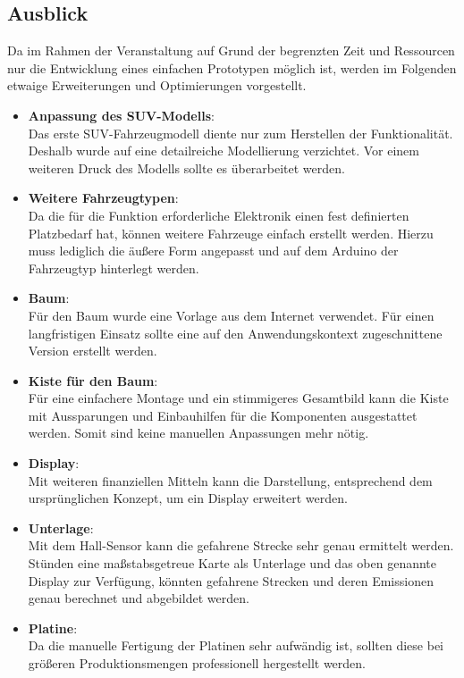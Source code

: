 \documentclass[.../Dokumentation.tex]{subfile}
\begin{document}
\subsection{Ausblick}\label{sec-outlook}
Da im Rahmen der Veranstaltung auf Grund der begrenzten Zeit und Ressourcen nur die Entwicklung eines einfachen Prototypen möglich ist, werden im Folgenden etwaige Erweiterungen und Optimierungen vorgestellt.
\begin{itemize}
	\item \textbf{Anpassung des SUV-Modells}:\\
	Das erste SUV-Fahrzeugmodell diente nur zum Herstellen der Funktionalität. 
	Deshalb wurde auf eine detailreiche Modellierung verzichtet. 
	Vor einem weiteren Druck des Modells sollte es überarbeitet werden.
	\item \textbf{Weitere Fahrzeugtypen}:\\
	Da die für die Funktion erforderliche Elektronik einen fest definierten 
	Platzbedarf hat, können weitere Fahrzeuge einfach erstellt werden. Hierzu 
	muss lediglich die äußere Form angepasst und auf dem Arduino der 
	Fahrzeugtyp hinterlegt werden. 
	\item \textbf{Baum}:\\
	Für den Baum wurde eine Vorlage aus dem Internet verwendet. Für einen 
	langfristigen Einsatz sollte eine auf den Anwendungskontext zugeschnittene 
	Version erstellt werden.
	\item \textbf{Kiste für den Baum}:\\
	Für eine einfachere Montage und ein stimmigeres Gesamtbild kann die Kiste 
	mit Aussparungen und Einbauhilfen für die Komponenten ausgestattet werden. 
	Somit sind keine manuellen Anpassungen mehr nötig.
	\item \textbf{Display}:\\
	Mit weiteren finanziellen Mitteln kann die Darstellung, entsprechend dem 
	ursprünglichen Konzept, um ein Display erweitert werden.
	\item \textbf{Unterlage}:\\
	Mit dem Hall-Sensor kann die gefahrene Strecke sehr genau ermittelt werden. 
	Stünden eine maßstabsgetreue Karte als Unterlage und das oben genannte 
	Display zur Verfügung, könnten gefahrene Strecken und deren Emissionen 
	genau berechnet und abgebildet werden.
	\item \textbf{Platine}:\\
	Da die manuelle Fertigung der Platinen sehr aufwändig ist, sollten diese 
	bei größeren Produktionsmengen professionell hergestellt werden.
\end{itemize}
   
\end{document}
